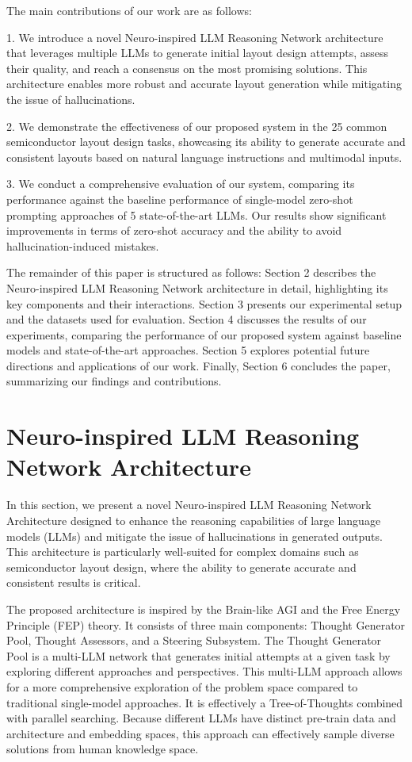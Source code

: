 \documentclass{article}
\begin{document}
The main contributions of our work are as follows:

1. We introduce a novel Neuro-inspired LLM Reasoning Network architecture that leverages multiple LLMs to generate initial layout design attempts, assess their quality, and reach a consensus on the most promising solutions. This architecture enables more robust and accurate layout generation while mitigating the issue of hallucinations.

2. We demonstrate the effectiveness of our proposed system in the 25 common semiconductor layout design tasks, showcasing its ability to generate accurate and consistent layouts based on natural language instructions and multimodal inputs.

3. We conduct a comprehensive evaluation of our system, comparing its performance against the baseline performance of single-model zero-shot prompting approaches of 5 state-of-the-art LLMs. Our results show significant improvements in terms of zero-shot accuracy and the ability to avoid hallucination-induced mistakes.

The remainder of this paper is structured as follows: Section 2 describes the Neuro-inspired LLM Reasoning Network architecture in detail, highlighting its key components and their interactions. Section 3 presents our experimental setup and the datasets used for evaluation. Section 4 discusses the results of our experiments, comparing the performance of our proposed system against baseline models and state-of-the-art approaches. Section 5 explores potential future directions and applications of our work. Finally, Section 6 concludes the paper, summarizing our findings and contributions.

\section{Neuro-inspired LLM Reasoning Network Architecture}

In this section, we present a novel Neuro-inspired LLM Reasoning Network Architecture designed to enhance the reasoning capabilities of large language models (LLMs) and mitigate the issue of hallucinations in generated outputs. This architecture is particularly well-suited for complex domains such as semiconductor layout design, where the ability to generate accurate and consistent results is critical.

The proposed architecture is inspired by the Brain-like AGI and the Free Energy Principle (FEP) theory. It consists of three main components: Thought Generator Pool, Thought Assessors, and a Steering Subsystem. The Thought Generator Pool is a multi-LLM network that generates initial attempts at a given task by exploring different approaches and perspectives. This multi-LLM approach allows for a more comprehensive exploration of the problem space compared to traditional single-model approaches. It is effectively a Tree-of-Thoughts combined with parallel searching. Because different LLMs have distinct pre-train data and architecture and embedding spaces, this approach can effectively sample diverse solutions from human knowledge space.
\end{document}

